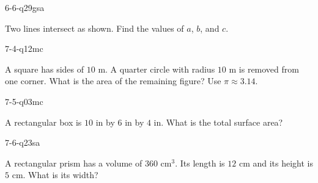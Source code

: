 \begin{practiceQuestion}{6-6-q29}{gsa}
\begin{questionText}
Two lines intersect as shown. Find the values of $a$, $b$, and $c$.

\begin{center}
\end{center}
\end{questionText}
\end{practiceQuestion}

\begin{practiceQuestion}{7-4-q12}{mc}
\begin{questionText}
A square has sides of $10$ m. A quarter circle with radius $10$ m is removed from one corner. What is the area of the remaining figure? Use $\pi \approx 3.14$.
\end{questionText}
\end{practiceQuestion}

\begin{practiceQuestion}{7-5-q03}{mc}
\begin{questionText}
A rectangular box is $10$ in by $6$ in by $4$ in. What is the total surface area?
\end{questionText}
\end{practiceQuestion}

\begin{practiceQuestion}{7-6-q23}{sa}
\begin{questionText}
A rectangular prism has a volume of $360$ cm$^3$. Its length is $12$ cm and its height is $5$ cm. What is its width?
\end{questionText}
\end{practiceQuestion}

